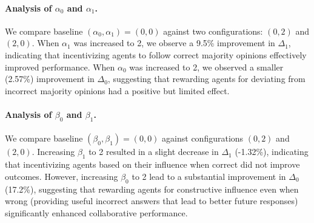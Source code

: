 \paragraph{Analysis of $\alpha_0$ and $\alpha_1$.}
We compare baseline $(\alpha_0, \alpha_1) = (0,0)$ against two configurations: $(0,2)$ and $(2,0)$. When $\alpha_1$ was increased to 2, we observe a 9.5\% improvement in $\Delta_1$, indicating that incentivizing agents to follow correct majority opinions effectively improved performance. When $\alpha_0$ was increased to 2, we observed a smaller (2.57\%) improvement in $\Delta_0$, suggesting that rewarding agents for deviating from incorrect majority opinions had a positive but limited effect.
\begin{table}[h]
    \centering
    \caption{Analysis of majority opinion influence under different $\beta$ parameters. Meaning of the column is the same as Table~\ref{tab:alpha_analysis}.
    }    \label{tab:beta_analysis}
\end{table}

\vspace{-6mm}

\paragraph{Analysis of $\beta_0$ and $\beta_1$.}
We compare baseline $(\beta_0, \beta_1) = (0,0)$  against configurations $(0,2)$ and $(2,0)$. Increasing $\beta_1$ to 2 resulted in a slight decrease in $\Delta_1$ (-1.32\%), indicating that incentivizing agents based on their influence when correct did not improve outcomes. However, increasing $\beta_0$ to 2 lead to a substantial improvement in $\Delta_0$ (17.2\%), suggesting that rewarding agents for constructive influence even when wrong (providing useful incorrect answers that lead to better future responses) significantly enhanced collaborative performance.



